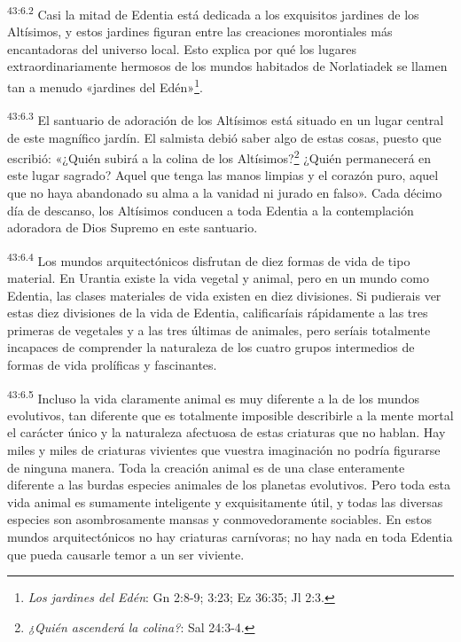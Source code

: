 \par
\textsuperscript{43:6.2} Casi la mitad de Edentia está dedicada a los exquisitos jardines de los Altísimos, y estos jardines figuran entre las creaciones morontiales más encantadoras del universo local. Esto explica por qué los lugares extraordinariamente hermosos de los mundos habitados de Norlatiadek se llamen tan a menudo «jardines del Edén»\footnote{\textit{Los jardines del Edén}: Gn 2:8-9; 3:23; Ez 36:35; Jl 2:3.}.

\par
\textsuperscript{43:6.3} El santuario de adoración de los Altísimos está situado en un lugar central de este magnífico jardín. El salmista debió saber algo de estas cosas, puesto que escribió: «¿Quién subirá a la colina de los Altísimos?\footnote{\textit{¿Quién ascenderá la colina?}: Sal 24:3-4.} ¿Quién permanecerá en este lugar sagrado? Aquel que tenga las manos limpias y el corazón puro, aquel que no haya abandonado su alma a la vanidad ni jurado en falso». Cada décimo día de descanso, los Altísimos conducen a toda Edentia a la contemplación adoradora de Dios Supremo en este santuario.

\par
\textsuperscript{43:6.4} Los mundos arquitectónicos disfrutan de diez formas de vida de tipo material. En Urantia existe la vida vegetal y animal, pero en un mundo como Edentia, las clases materiales de vida existen en diez divisiones. Si pudierais ver estas diez divisiones de la vida de Edentia, calificaríais rápidamente a las tres primeras de vegetales y a las tres últimas de animales, pero seríais totalmente incapaces de comprender la naturaleza de los cuatro grupos intermedios de formas de vida prolíficas y fascinantes.

\par
\textsuperscript{43:6.5} Incluso la vida claramente animal es muy diferente a la de los mundos evolutivos, tan diferente que es totalmente imposible describirle a la mente mortal el carácter único y la naturaleza afectuosa de estas criaturas que no hablan. Hay miles y miles de criaturas vivientes que vuestra imaginación no podría figurarse de ninguna manera. Toda la creación animal es de una clase enteramente diferente a las burdas especies animales de los planetas evolutivos. Pero toda esta vida animal es sumamente inteligente y exquisitamente útil, y todas las diversas especies son asombrosamente mansas y conmovedoramente sociables. En estos mundos arquitectónicos no hay criaturas carnívoras; no hay nada en toda Edentia que pueda causarle temor a un ser viviente.

